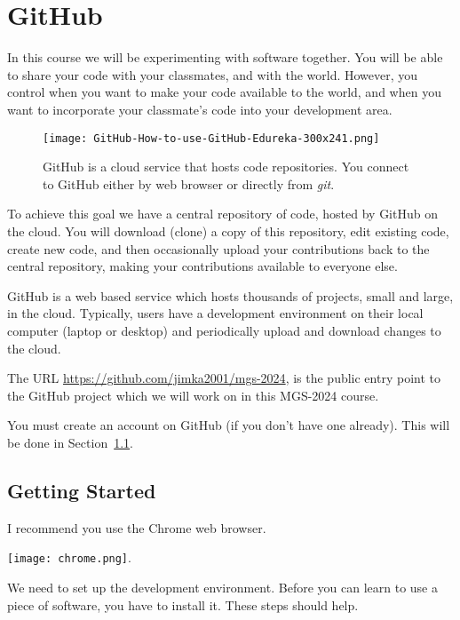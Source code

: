\section{GitHub}
\label{sec.github}
In this course we will be experimenting with software together.  You
will be able to share your code with your classmates, and with the
world.  However, you control when you want to make your code available
to the world, and when you want to incorporate your classmate's code
into your development area.


\begin{figure}[h]
  \centering
  \texttt{[image: GitHub-How-to-use-GitHub-Edureka-300x241.png]}
  \caption{GitHub is a cloud service that hosts code repositories.
    You connect to GitHub either by web browser or directly from
    \emph{git}.}
\end{figure}




To achieve this goal we have a central repository of code, hosted by
GitHub on the cloud.  You will download (clone) a copy of this
repository, edit existing code, create new code, and then
occasionally upload your contributions back to the central repository,
making your contributions available to everyone else.

GitHub is a web based service which hosts thousands of projects, small
and large, in the cloud.  Typically, users have a development
environment on their local computer (laptop or desktop) and
periodically upload and download changes to the cloud.

The URL \url{https://github.com/jimka2001/mgs-2024}, is the public
entry point to the GitHub project which we will work on in this
MGS-2024 course.  

You must create an account on GitHub (if you don't have one already).
This will be done in Section~\ref{sec.setup}.


\subsection{Getting Started}
\label{sec.setup}

I recommend you use the Chrome web browser.

\texttt{[image: chrome.png]}.

We need to set up the development environment.  Before you can learn
to use a piece of software, you have to install it. These steps should
help.

